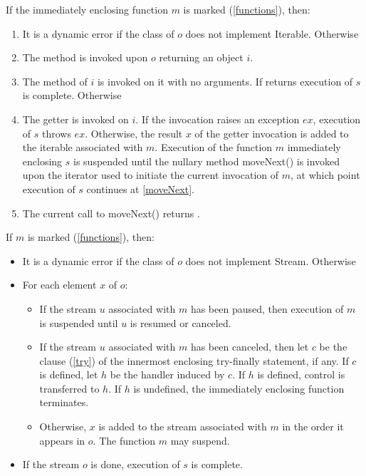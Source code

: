 \documentclass{article}
\newcommand{\code}[1]{{\sf #1}}
\begin{document}
\begin{itemize}
\LMHash{}
If the immediately enclosing function $m$ is marked \SYNC* (\ref{functions}), then:
\begin{enumerate}
\item It is a dynamic error if the class of $o$ does not implement \code{Iterable}.  Otherwise
\item The method  is invoked upon $o$ returning an object $i$.
\item \label{moveNext} The  method of $i$ is invoked on it with no arguments. If  returns \FALSE{} execution of $s$ is complete. Otherwise
\item The getter  is invoked on $i$. If the invocation raises an exception $ex$, execution of $s$ throws $ex$. Otherwise, the result $x$ of the getter invocation is added to the iterable associated with $m$.
Execution of the function $m$ immediately enclosing $s$ is suspended until the nullary method \code{moveNext()} is invoked upon the iterator used to initiate the current invocation of $m$, at which point execution of $s$ continues at \ref{moveNext}.
\item
The current call to \code{moveNext()} returns \TRUE.
\end{enumerate}

\LMHash{}
If $m$ is marked \ASYNC* (\ref{functions}), then:
\begin{itemize}
\item  It is a dynamic error if the class of $o$ does not implement \code{Stream}. Otherwise
\item For each element $x$ of $o$:
\begin{itemize}
\item
If the stream $u$ associated with $m$ has been paused,  then execution of $m$ is suspended until $u$ is resumed or canceled.
 \item
If the stream $u$ associated with $m$ has been canceled, then let $c$ be the \FINALLY{} clause (\ref{try}) of the innermost enclosing try-finally statement, if any. If $c$ is defined,  let $h$ be the handler induced by $c$. If $h$ is defined, control is transferred to $h$. If $h$ is undefined, the immediately enclosing function terminates.
\item
Otherwise,  $x$ is added to the stream associated with $m$ in the order it appears in $o$.  The function $m$ may suspend.
\end{itemize}
\item If the stream $o$ is done, execution of $s$ is complete.
\end{itemize}



\end{itemize}
\end{document}
